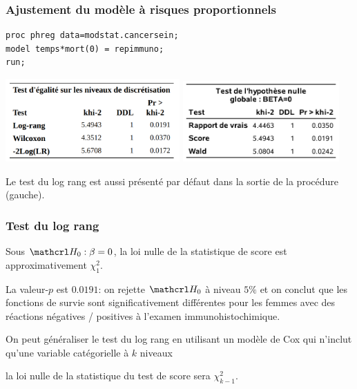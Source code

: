 \documentclass{beamer}
\begin{document}
\begin{frame}[fragile]
\frametitle{Ajustement du modèle à risques proportionnels}
\begin{tcolorbox}[colback=white,colframe=hecblue, title=Code \SASlang{} pour le modèle de risques proportionnels]
\begin{verbatim}
proc phreg data=modstat.cancersein;
model temps*mort(0) = repimmuno;
run;
\end{verbatim}
\end{tcolorbox}
\begin{center}
\includegraphics[width = 0.5\textwidth]{img/c7/diapos7e16}
\includegraphics[width = 0.45\textwidth]{img/c7/diapos7e17}
\end{center}
{\footnotesize 

Le test du log rang est aussi présenté par défaut dans la sortie \SASlang{} de la procédure  (gauche).

}
\end{frame}

\begin{frame}
\frametitle{Test du log rang}
\bi 
\item Sous $\Hy_0: \beta=0$, la loi nulle de la statistique de score est approximativement $\chi^2_1$.
\item La valeur-$p$  est $0.0191$: on rejette $\Hy_0$ à niveau $5\%$ et on conclut que les fonctions de survie sont significativement différentes pour les femmes avec des réactions négatives / positives à l'examen immunohistochimique. 
\item On peut généraliser le test du log rang en utilisant un modèle de Cox qui n'inclut qu'une variable catégorielle à $k$ niveaux
\bi \item la loi nulle de la statistique du test de score sera $\chi^2_{k-1}$.
\ei
\ei 
\end{frame}
\end{document}
